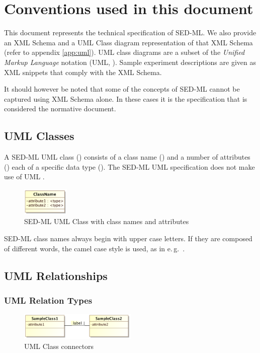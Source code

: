 \section{Conventions used in this document}
\label{sec:conventions}

This document represents the technical specification of SED-ML. We also provide an
XML Schema \citep{xmls} and a UML Class diagram representation of that XML Schema (refer to appendix \ref{app:uml}). UML class diagrams are a subset of the \emph{Unified Markup Language} notation (UML, \citep{uml22}). Sample experiment descriptions are given as XML snippets that comply with the XML Schema.

It should however be noted that some of the concepts of SED-ML cannot be captured using XML Schema alone. In these cases it is the specification that is considered the normative document. 

\subsection{UML Classes}
\label{sec:umlconventions}
A SED-ML UML class () consists of a class name () and a number of attributes () each of a specific data type (). The SED-ML UML specification does not make use of UML .
\begin{figure}[h]
\centering
\includegraphics[width=0.2\textwidth]{images/uml/umlClass.png}
\caption{SED-ML UML Class with class names and attributes}
\label{fig:umlClass}
\end{figure}

SED-ML class names always begin with upper case letters. If they are composed of different words, the camel case style is used, as in e.\,g.\ .

\subsection{UML Relationships}
\subsubsection{UML Relation Types}
\begin{figure}[h]
\centering
\includegraphics[width=0.5\textwidth]{images/uml/classRelation.png}
\caption{UML Class connectors}
\label{fig:umlConnectors}
\end{figure}

